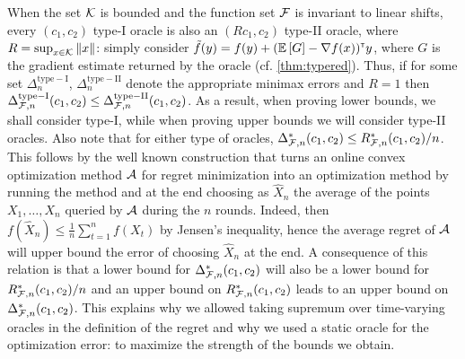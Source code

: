 When the set $\mathcal{K}$ is bounded and the function set $\mathcal{F}$ is invariant to linear shifts, every $(c_1,c_2)$ type-I oracle is also an $(R c_1,c_2)$ type-II oracle,
where $R = \sup_{x\in \mathcal{K}} \left\|x\right\|$: simply consider $\tilde{f}(y) =  f(y) + (\mathbb{E}\left[G\right]-\nabla f(x))^\mathsf{\scriptscriptstyle T} y $,
where $G$ is the gradient estimate returned by the oracle (cf. \cref{thm:typered}).
Thus, if for some set $\Delta_{n}^{\mathrm{type-I}}$, $\Delta_{n}^{\mathrm{type-II}}$
denote the appropriate minimax errors and $R=1$
then $\Delta_{\mathcal{F},n}^{\mathrm{type-I}}(c_1,c_2) \le \Delta_{\mathcal{F},n}^{\mathrm{type-II}}(c_1,c_2)  $.
As a result, when proving lower bounds, we shall consider type-I, while when proving upper bounds we will consider type-II oracles.
Also note that for either type of oracles, $\Delta_{\mathcal{F},n}^*(c_1,c_2) \le R_{\mathcal{F},n}^*(c_1,c_2)/n$. This follows by the well known construction that turns an online convex optimization method $\mathcal{A}$ for regret minimization into an optimization method by running the method and at the end choosing as $\hat{X}_n$ the average of the points $X_1,\dots,X_n$ queried by $\mathcal{A}$ during the $n$ rounds.
Indeed, then $f(\hat{X}_n) \le \frac1n \sum_{t=1}^n f(X_t)$ by Jensen's inequality, hence the average regret of $\mathcal{A}$ will upper bound the error of choosing $\hat{X}_n$ at the end.
A consequence of this relation is that a lower bound for $\Delta_{\mathcal{F},n}^*(c_1,c_2) $ will also be a lower bound for $R^*_{\mathcal{F},n}(c_1,c_2)/n$ and an upper bound on $R^*_{\mathcal{F},n}(c_1,c_2)$ leads to an upper bound on $\Delta_{\mathcal{F},n}^*(c_1,c_2)$. This explains why we allowed taking supremum over time-varying oracles in the definition of the regret and why we used a static oracle for the optimization error: to maximize the strength of the bounds we obtain.

